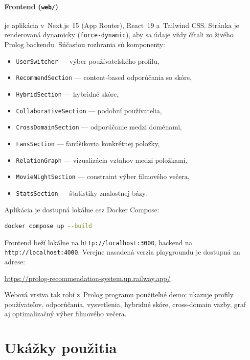 \documentclass[11pt,a4paper]{article}
\begin{document}
\paragraph{Frontend (\texttt{web/})} je aplikácia v~Next.js~15
(App Router), React~19 a~Tailwind CSS. Stránka je renderovaná
dynamicky (\texttt{force-dynamic}), aby sa údaje vždy čítali zo
živého Prolog backendu. Súčasťou rozhrania sú komponenty:

\begin{itemize}[noitemsep]
  \item \texttt{UserSwitcher} --- výber používateľského profilu,
  \item \texttt{RecommendSection} --- content-based odporúčania so skóre,
  \item \texttt{HybridSection} --- hybridné skóre,
  \item \texttt{CollaborativeSection} --- podobní používatelia,
  \item \texttt{CrossDomainSection} --- odporúčanie medzi doménami,
  \item \texttt{FansSection} --- fanúšikovia konkrétnej položky,
  \item \texttt{RelationGraph} --- vizualizácia vzťahov medzi položkami,
  \item \texttt{MovieNightSection} --- constraint výber filmového večera,
  \item \texttt{StatsSection} --- štatistiky znalostnej bázy.
\end{itemize}

Aplikácia je dostupná lokálne cez Docker Compose:

\begin{lstlisting}[language=bash, numbers=none]
docker compose up --build
\end{lstlisting}

\noindent
Frontend beží lokálne na \texttt{http://localhost:3000}, backend na
\texttt{http://localhost:4000}. Verejne nasadená verzia playgroundu je
dostupná na adrese:

\begin{center}
\url{https://prolog-recommendation-system.up.railway.app/}
\end{center}

\noindent
Webová vrstva tak robí z~Prolog programu použiteľné demo: ukazuje
profily používateľov, odporúčania, vysvetlenia, hybridné skóre,
cross-domain väzby, graf aj optimalizačný výber filmového večera.

\section{Ukážky použitia}
\end{document}
